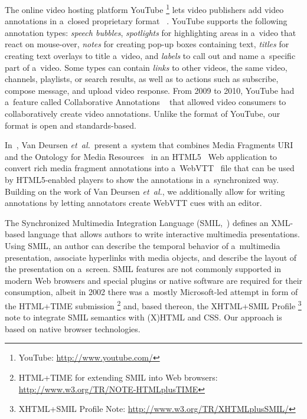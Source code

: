 \documentclass{sig-alternate}
\newcommand{\inlinelistingsize}{\fontsize{8pt}{11pt}}
\let\oldurl\url
\renewcommand{\url}[1]{\inlinelistingsize\oldurl{#1}}
\begin{document}
The online video hosting platform YouTube%
\footnote{YouTube: \url{http://www.youtube.com/}}
lets video publishers add video annotations
in a~closed proprietary format%
~\cite{youtube2010annotations}.
YouTube supports the following
annotation types: \emph{speech bubbles},
\emph{spotlights} for highlighting areas in a~video
that react on mouse-over,
\emph{notes} for creating pop-up boxes containing text,
\emph{titles} for creating text overlays to title a~video,
and \emph{labels} to call out
and name a~specific part of a~video.
Some types can contain \emph{links}
to other videos, the same video, channels, playlists,
or search results, as well as to actions
such as subscribe, compose message, and upload video response.
From 2009 to 2010, YouTube had a~feature called
Collaborative Annotations%
~\cite{fink2009collaborativeannotations}
that allowed video consumers to collaboratively
create video annotations.
Unlike the format of YouTube, our format is open and standards-based.

In~\cite{vandeursen2012mediafragmentannotations},
Van Deursen \emph{et~al.}\ present a~system
that combines Media Fragments URI~\cite{troncy2012mediafragments}
and the Ontology for Media Resources~\cite{lee2012mediaontology}
in an HTML5~\cite{berjon2013html5}
Web application to convert rich media fragment annotations
into a~WebVTT~\cite{pfeiffer2013webvtt} file
that can be used by HTML5-enabled players
to show the annotations in a~synchronized way.
Building on the work of Van Deursen \emph{et~al.},
we additionally allow for writing annotations by
letting annotators create WebVTT cues with an editor.

The Synchronized Multimedia Integration Language\linebreak
(SMIL,~\cite{bulterman2006smil})
defines an XML-based language that allows authors
to write interactive multimedia presentations.
Using SMIL, an author can describe the temporal behavior
of a~multimedia presentation, associate hyperlinks
with media objects, and describe the layout
of the presentation on a~screen.
SMIL features are not commonly supported
in modern Web browsers and special plugins or native software
are required for their consumption,
albeit in 2002 there was a~mostly Microsoft-led attempt
in form of the HTML+TIME submission%
\footnote{HTML+TIME for extending SMIL into Web browsers: \url{http://www.w3.org/TR/NOTE-HTMLplusTIME}}
and, based thereon, the XHTML+SMIL Profile%
\footnote{XHTML+SMIL Profile Note:
\url{http://www.w3.org/TR/XHTMLplusSMIL/}} note
to integrate SMIL semantics with (X)HTML and CSS.
Our approach is based on native browser technologies.
\end{document}
